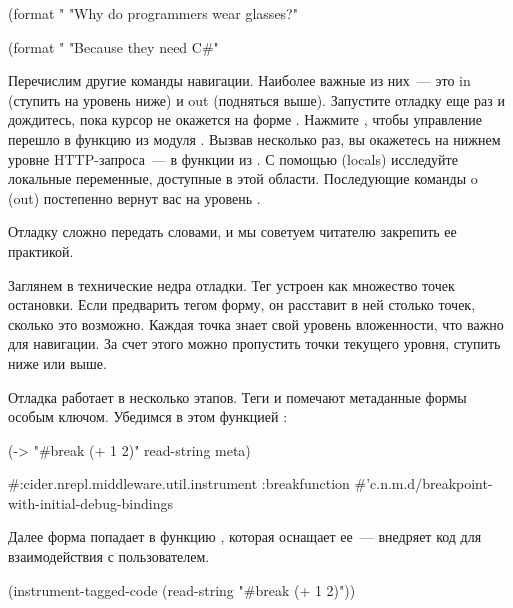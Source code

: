 \begin{english}
  \begin{clojure}
(format "%
  "Why do programmers wear glasses?"

(format "%
  "Because they need C#"
  \end{clojure}
\end{english}

Перечислим другие команды навигации. Наиболее важные из них~--- это in (ступить на уровень ниже) и out (подняться выше). Запустите отладку еще раз и дождитесь, пока курсор не окажется на форме . Нажмите , чтобы управление перешло в функцию  из модуля . Вызвав  несколько раз, вы окажетесь на нижнем уровне HTTP-запроса~--- в функции  из . С помощью  (locals) исследуйте локальные переменные, доступные в этой области. Последующие команды o (out) постепенно вернут вас на уровень .

Отладку сложно передать словами, и мы советуем читателю закрепить ее практикой.

Заглянем в технические недра отладки. Тег  устроен как множество точек остановки. Если предварить тегом форму, он расставит в ней столько точек, сколько это возможно. Каждая точка знает свой уровень вложенности, что важно для навигации. За счет этого можно пропустить точки текущего уровня, ступить ниже или выше.

Отладка работает в несколько этапов. Теги  и  помечают метаданные формы особым ключом. Убедимся в этом функцией :

\begin{english}
  \begin{clojure}
(-> "#break (+ 1 2)"
    read-string
    meta)

#:cider.nrepl.middleware.util.instrument
{:breakfunction
 #'c.n.m.d/breakpoint-with-initial-debug-bindings}
  \end{clojure}
\end{english}

Далее форма попадает в функцию , которая оснащает ее~--- внедряет код для взаимодействия с пользователем.

\begin{english}
  \begin{clojure}
(instrument-tagged-code
 (read-string "#break (+ 1 2)"))
  \end{clojure}
\end{english}

